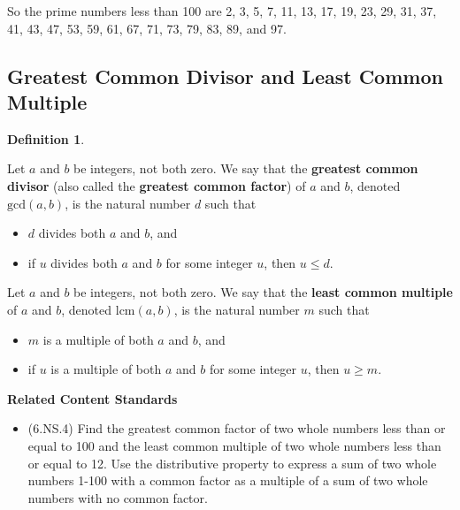 \documentclass[
]{book}
\providecommand{\tightlist}{%
  \setlength{\itemsep}{0pt}\setlength{\parskip}{0pt}}
\newenvironment{standards}{}{}
\theoremstyle{definition}
\newtheorem{definition}{Definition}[chapter]
\theoremstyle{definition}
\theoremstyle{definition}
\theoremstyle{definition}
\theoremstyle{remark}
\begin{document}
So the prime numbers less than 100 are 2, 3, 5, 7, 11, 13, 17, 19, 23, 29, 31, 37, 41, 43, 47, 53, 59, 61, 67, 71, 73, 79, 83, 89, and 97.

\hypertarget{greatest-common-divisor-and-least-common-multiple}{%
\subsection{Greatest Common Divisor and Least Common Multiple}\label{greatest-common-divisor-and-least-common-multiple}}

\begin{definition}
\protect\hypertarget{def:unlabeled-div-105}{}\label{def:unlabeled-div-105}

Let \(a\) and \(b\) be integers, not both zero. We say that the \textbf{greatest common divisor} (also called the \textbf{greatest common factor}) of \(a\) and \(b\), denoted \(\mathrm{gcd}(a,b)\), is the natural number \(d\) such that

\begin{itemize}
\tightlist
\item
  \(d\) divides both \(a\) and \(b\), and
\item
  if \(u\) divides both \(a\) and \(b\) for some integer \(u\), then \(u\leq d\).
\end{itemize}

Let \(a\) and \(b\) be integers, not both zero. We say that the \textbf{least common multiple} of \(a\) and \(b\), denoted \(\mathrm{lcm}(a,b)\), is the natural number \(m\) such that

\begin{itemize}
\tightlist
\item
  \(m\) is a multiple of both \(a\) and \(b\), and
\item
  if \(u\) is a multiple of both \(a\) and \(b\) for some integer \(u\), then \(u\geq m\).
\end{itemize}

\end{definition}

\begin{standards}

\begin{center}
\textbf{Related Content Standards}

\end{center}

\begin{itemize}
\tightlist
\item
  (6.NS.4) Find the greatest common factor of two whole numbers less than or equal to 100 and the least common multiple of two whole numbers less than or equal to 12. Use the distributive property to express a sum of two whole numbers 1-100 with a common factor as a multiple of a sum of two whole numbers with no common factor.\\
\end{itemize}

\end{standards}
\end{document}
